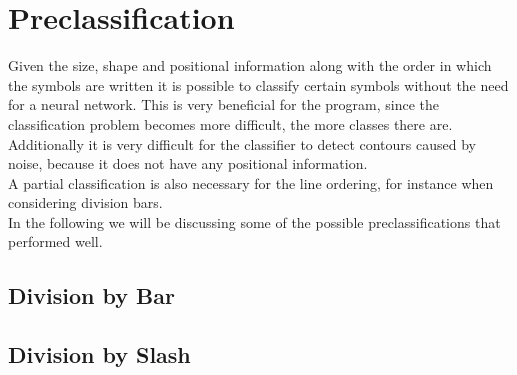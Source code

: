 \documentclass[12pt]{article}
\begin{document}
\section{Preclassification}
	Given the size, shape and positional information along with the order in which the symbols are written it is possible to classify certain symbols without the need for a neural network.
	This is very beneficial for the program, since the classification problem becomes more difficult, the more classes there are.
	Additionally it is very difficult for the classifier to detect contours caused by noise, because it does not have any positional information.\\
	A partial classification is also necessary for the line ordering, for instance when considering division bars.\\
	In the following we will be discussing some of the possible preclassifications that performed well.
	
	\subsection{Division by Bar}
	
	\subsection{Division by Slash}
	
\end{document}
